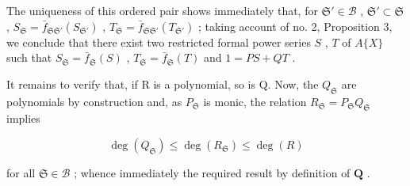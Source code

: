 The uniqueness of this ordered pair shows immediately that, for \(\mathfrak{S}' \in \mathcal{B}\) , \(\mathfrak{S}' \subset \mathfrak{S}\) , \(S_{\mathfrak{S}} = \bar{f}_{\mathfrak{S}\mathfrak{S}'}(S_{\mathfrak{S}'})\) , \(T_{\mathfrak{S}} = \bar{f}_{\mathfrak{S}\mathfrak{S}'}(T_{\mathfrak{S}'})\) ; taking account of no. 2, Proposition 3, we conclude that there exist two restricted formal power series \(S\) , \(T\) of \(A\{X\}\) such that \(S_{\mathfrak{S}} = \bar{f}_{\mathfrak{S}}(S)\) , \(T_{\mathfrak{S}} = \bar{f}_{\mathfrak{S}}(T)\) and \(1 = PS + QT\) .

It remains to verify that, if R is a polynomial, so is Q. Now, the \(Q_{\mathfrak{S}}\) are polynomials by construction and, as \(P_{\mathfrak{S}}\) is monic, the relation \(R_{\mathfrak{S}} = P_{\mathfrak{S}}Q_{\mathfrak{S}}\) implies

\[
\deg (Q _ {\mathfrak {S}}) \leqslant \deg (R _ {\mathfrak {S}}) \leqslant \deg (R)
\]

for all \(\mathfrak{S} \in \mathcal{B}\) ; whence immediately the required result by definition of \(\mathbf{Q}\) .
